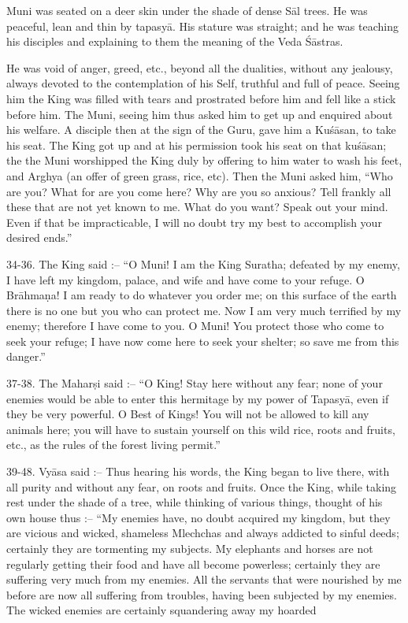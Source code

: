 Muni was seated on a deer skin under the shade of dense S\=al trees. He was peaceful, lean and thin by tapasy\=a. His stature was straight; and he was teaching his disciples and explaining to them the meaning of the Veda \'S\=astras.

He was void of anger, greed, etc., beyond all the dualities, without any jealousy, always devoted to the contemplation of his Self, truthful and full of peace. Seeing him the King was filled with tears and prostrated before him and fell like a stick before him. The Muni, seeing him thus asked him to get up and enquired about his welfare. A disciple then at the sign of the Guru, gave him a Ku\'s\=asan, to take his seat. The King got up and at his permission took his seat on that ku\'s\=asan; the the Muni worshipped the King duly by offering to him water to wash his feet, and Arghya (an offer of green grass, rice, etc). Then the Muni asked him, ``Who are you? What for are you come here? Why are you so anxious? Tell frankly all these that are not yet known to me. What do you want? Speak out your mind. Even if that be impracticable, I will no doubt try my best to accomplish your desired ends.''

34-36. The King said :-- ``O Muni! I am the King Suratha; defeated by my enemy, I have left my kingdom, palace, and wife and have come to your refuge. O Br\=ahma\d{n}a! I am ready to do whatever you order me; on this surface of the earth there is no one but you who can protect me. Now I am very much terrified by my enemy; therefore I have come to you. O Muni! You protect those who come to seek your refuge; I have now come here to seek your shelter; so save me from this danger.''

37-38. The Mahar\d{s}i said :-- ``O King! Stay here without any fear; none of your enemies would be able to enter this hermitage by my power of Tapasy\=a, even if they be very powerful. O Best of Kings! You will not be allowed to kill any animals here; you will have to sustain yourself on this wild rice, roots and fruits, etc., as the rules of the forest living permit.''

39-48. Vy\=asa said :-- Thus hearing his words, the King began to live there, with all purity and without any fear, on roots and fruits. Once the King, while taking rest under the shade of a tree, while thinking of various things, thought of his own house thus :-- ``My enemies have, no doubt acquired my kingdom, but they are vicious and wicked, shameless Mlechchas and always addicted to sinful deeds; certainly they are tormenting my subjects. My elephants and horses are not regularly getting their food and have all become powerless; certainly they are suffering very much from my enemies. All the servants that were nourished by me before are now all suffering from troubles, having been subjected by my enemies. The wicked enemies are certainly squandering away my hoarded

